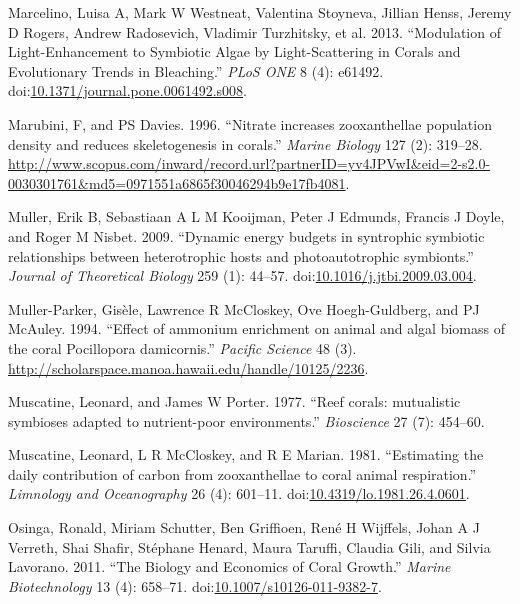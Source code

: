\documentclass[]{elsarticle} %
\begin{document}
\hypertarget{ref-Marcelino:2013hz}{}
Marcelino, Luisa A, Mark W Westneat, Valentina Stoyneva, Jillian Henss,
Jeremy D Rogers, Andrew Radosevich, Vladimir Turzhitsky, et al. 2013.
``Modulation of Light-Enhancement to Symbiotic Algae by Light-Scattering
in Corals and Evolutionary Trends in Bleaching.'' \emph{PLoS ONE} 8 (4):
e61492.
doi:\href{https://doi.org/10.1371/journal.pone.0061492.s008}{10.1371/journal.pone.0061492.s008}.

\hypertarget{ref-Marubini:1996p8460}{}
Marubini, F, and PS Davies. 1996. ``Nitrate increases zooxanthellae
population density and reduces skeletogenesis in corals.'' \emph{Marine
Biology} 127 (2): 319--28.
\url{http://www.scopus.com/inward/record.url?partnerID=yv4JPVwI\&eid=2-s2.0-0030301761\&md5=0971551a6865f30046294b9e17fb4081}.

\hypertarget{ref-Muller:2009io}{}
Muller, Erik B, Sebastiaan A L M Kooijman, Peter J Edmunds, Francis J
Doyle, and Roger M Nisbet. 2009. ``Dynamic energy budgets in syntrophic
symbiotic relationships between heterotrophic hosts and photoautotrophic
symbionts.'' \emph{Journal of Theoretical Biology} 259 (1): 44--57.
doi:\href{https://doi.org/10.1016/j.jtbi.2009.03.004}{10.1016/j.jtbi.2009.03.004}.

\hypertarget{ref-MullerParker:1994uo}{}
Muller-Parker, Gisèle, Lawrence R McCloskey, Ove Hoegh-Guldberg, and PJ
McAuley. 1994. ``Effect of ammonium enrichment on animal and algal
biomass of the coral Pocillopora damicornis.'' \emph{Pacific Science} 48
(3). \url{http://scholarspace.manoa.hawaii.edu/handle/10125/2236}.

\hypertarget{ref-Muscatine:1977p4220}{}
Muscatine, Leonard, and James W Porter. 1977. ``Reef corals: mutualistic
symbioses adapted to nutrient-poor environments.'' \emph{Bioscience} 27
(7): 454--60.

\hypertarget{ref-Muscatine:1981jy}{}
Muscatine, Leonard, L R McCloskey, and R E Marian. 1981. ``Estimating
the daily contribution of carbon from zooxanthellae to coral animal
respiration.'' \emph{Limnology and Oceanography} 26 (4): 601--11.
doi:\href{https://doi.org/10.4319/lo.1981.26.4.0601}{10.4319/lo.1981.26.4.0601}.

\hypertarget{ref-Osinga:2011kq}{}
Osinga, Ronald, Miriam Schutter, Ben Griffioen, René H Wijffels, Johan A
J Verreth, Shai Shafir, Stéphane Henard, Maura Taruffi, Claudia Gili,
and Silvia Lavorano. 2011. ``The Biology and Economics of Coral
Growth.'' \emph{Marine Biotechnology} 13 (4): 658--71.
doi:\href{https://doi.org/10.1007/s10126-011-9382-7}{10.1007/s10126-011-9382-7}.
\end{document}
